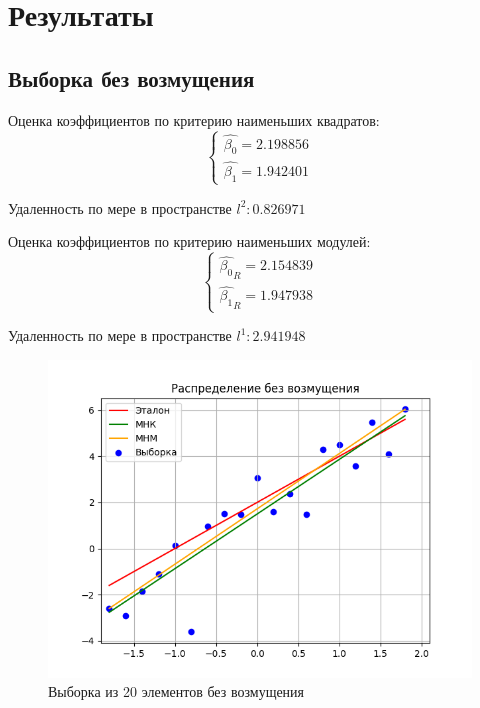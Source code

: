 \documentclass[12pt,a4paper]{article}
\begin{document}
\section {Результаты}
\subsection{Выборка без возмущения}
Оценка коэффициентов по критерию наименьших квадратов:
\begin{equation}
    \left\{
    \begin{array}{ll}
        \hat{\beta_0}=2.198856\\
        \hat{\beta_1}=1.942401
    \end{array}
    \right.
\end{equation}

Удаленность по мере в пространстве $l^2:0.826971$

Оценка коэффициентов по критерию наименьших модулей:
\begin{equation}
    \left\{
    \begin{array}{ll}
        \hat{\beta_0}_R=2.154839\\
        \hat{\beta_1}_R=1.947938
    \end{array}
    \right.
\end{equation}

Удаленность по мере в пространстве $l^1: 2.941948$
\begin{figure}[H]
    \centering
    \includegraphics{images/noDisturbance.png}
    \caption{Выборка из 20 элементов без возмущения}
\end{figure}
\end{document}
